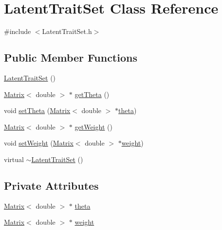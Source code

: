 \hypertarget{classLatentTraitSet}{}\section{Latent\+Trait\+Set Class Reference}
\label{classLatentTraitSet}


{\ttfamily \#include $<$Latent\+Trait\+Set.\+h$>$}

\subsection*{Public Member Functions}
\begin{DoxyCompactItemize}
\item 
\hyperlink{classLatentTraitSet_ae11a4a1e289c42f54179ee47a4fd2ab2}{Latent\+Trait\+Set} ()
\item 
\hyperlink{singletonMatrix}{Matrix}$<$ double $>$ $\ast$ \hyperlink{classLatentTraitSet_aed95a0c5c87256960ffb528ca491f2c0}{get\+Theta} ()
\item 
void \hyperlink{classLatentTraitSet_af8133cfb7853d19f0490079ebc146b6c}{set\+Theta} (\hyperlink{singletonMatrix}{Matrix}$<$ double $>$ $\ast$\hyperlink{classLatentTraitSet_a8e5ce0fbc5b17577bcd06b58d3c5b079}{theta})
\item 
\hyperlink{singletonMatrix}{Matrix}$<$ double $>$ $\ast$ \hyperlink{classLatentTraitSet_a1f48623a0834d134df2ddea3892a5b11}{get\+Weight} ()
\item 
void \hyperlink{classLatentTraitSet_a8a3c362f857d4094f7e2da4f47a9499b}{set\+Weight} (\hyperlink{singletonMatrix}{Matrix}$<$ double $>$ $\ast$\hyperlink{classLatentTraitSet_a8db0053af1838ab0a4e25d5c6abc4384}{weight})
\item 
virtual \hyperlink{classLatentTraitSet_ab502c9823e8c7ed995b0d87d1af94aee}{$\sim$\+Latent\+Trait\+Set} ()
\end{DoxyCompactItemize}
\subsection*{Private Attributes}
\begin{DoxyCompactItemize}
\item 
\hyperlink{singletonMatrix}{Matrix}$<$ double $>$ $\ast$ \hyperlink{classLatentTraitSet_a8e5ce0fbc5b17577bcd06b58d3c5b079}{theta}
\item 
\hyperlink{singletonMatrix}{Matrix}$<$ double $>$ $\ast$ \hyperlink{classLatentTraitSet_a8db0053af1838ab0a4e25d5c6abc4384}{weight}
\end{DoxyCompactItemize}


